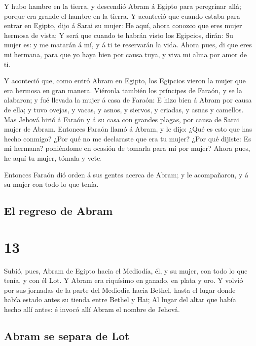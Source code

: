  Y hubo hambre en la tierra, y descendió Abram á Egipto
para peregrinar allá; porque era grande el hambre en la tierra.
 Y aconteció que cuando estaba para entrar en Egipto, dijo
á Sarai su mujer: He aquí, ahora conozco que eres mujer hermosa de
vista;  Y será que cuando te habrán visto los Egipcios,
dirán: Su mujer es: y me matarán á mí, y á ti te reservarán la vida.
 Ahora pues, di que eres mi hermana, para que yo haya bien
por causa tuya, y viva mi alma por amor de ti.

 Y aconteció que, como entró Abram en Egipto, los Egipcios
vieron la mujer que era hermosa en gran manera.  Viéronla
también los príncipes de Faraón, y se la alabaron; y fué llevada la
mujer á casa de Faraón:  E hizo bien á Abram por causa de
ella; y tuvo ovejas, y vacas, y asnos, y siervos, y criadas, y asnas y
camellos.  Mas Jehová hirió á Faraón y á su casa con
grandes plagas, por causa de Sarai mujer de Abram. 
Entonces Faraón llamó á Abram, y le dijo: ¿Qué es esto que has hecho
conmigo? ¿Por qué no me declaraste que era tu mujer?  ¿Por
qué dijiste: Es mi hermana? poniéndome en ocasión de tomarla para mí por
mujer? Ahora pues, he aquí tu mujer, tómala y vete.

 Entonces Faraón dió orden á sus gentes acerca de Abram; y
le acompañaron, y á su mujer con todo lo que tenía.

\hypertarget{el-regreso-de-abram}{%
\subsection{El regreso de Abram}\label{el-regreso-de-abram}}

\hypertarget{section-12}{%
\section{13}\label{section-12}}

 Subió, pues, Abram de Egipto hacia el Mediodía, él, y su
mujer, con todo lo que tenía, y con él Lot.  Y Abram era
riquísimo en ganado, en plata y oro.  Y volvió por sus
jornadas de la parte del Mediodía hacia Bethel, hasta el lugar donde
había estado antes su tienda entre Bethel y Hai;  Al lugar
del altar que había hecho allí antes: é invocó allí Abram el nombre de
Jehová.

\hypertarget{abram-se-separa-de-lot}{%
\subsection{Abram se separa de Lot}\label{abram-se-separa-de-lot}}


